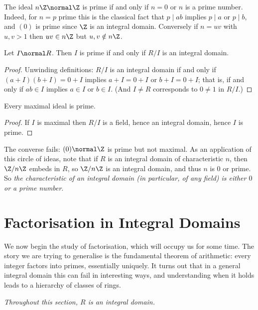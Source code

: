 \begin{example}
	The ideal $n\Z \normal \Z$ is prime if and only if $n = 0$ or $n$ is a prime number. Indeed, for $n = p$ prime this is the classical fact that $p \mid ab$ implies $p \mid a$ or $p \mid b$, and $(0)$ is prime since $\Z$ is an integral domain. Conversely if $n = uv$ with $u, v > 1$ then $uv \in n\Z$ but $u, v \notin n\Z$.
\end{example}

\begin{proposition}
	Let $I \normal R$. Then $I$ is prime if and only if $R/I$ is an integral domain.
\end{proposition}
\begin{proof}
	Unwinding definitions: $R/I$ is an integral domain if and only if $(a + I)(b + I) = 0 + I$ implies $a + I = 0 + I$ or $b + I = 0 + I$; that is, if and only if $ab \in I$ implies $a \in I$ or $b \in I$. (And $I \neq R$ corresponds to $0 \neq 1$ in $R/I$.)
\end{proof}

\begin{corollary}
	Every maximal ideal is prime.
\end{corollary}
\begin{proof}
	If $I$ is maximal then $R/I$ is a field, hence an integral domain, hence $I$ is prime.
\end{proof}

The converse fails: $(0) \normal \Z$ is prime but not maximal. As an application of this circle of ideas, note that if $R$ is an integral domain of characteristic $n$, then $\Z/n\Z$ embeds in $R$, so $\Z/n\Z$ is an integral domain, and thus $n$ is $0$ or prime. So \emph{the characteristic of an integral domain (in particular, of any field) is either $0$ or a prime number}.

\section{Factorisation in Integral Domains}

We now begin the study of factorisation, which will occupy us for some time. The story we are trying to generalise is the fundamental theorem of arithmetic: every integer factors into primes, essentially uniquely. It turns out that in a general integral domain this can fail in interesting ways, and understanding when it holds leads to a hierarchy of classes of rings.

\emph{Throughout this section, $R$ is an integral domain.}


